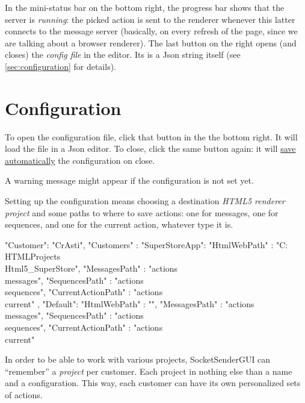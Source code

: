 \documentclass[11pt]{refart}
\newcommand{\marginicon}[2][]{\marginlabel{\raisebox{-.1\height}{\texttt{[image: \#2]}}}}
\newcommand*{\textAtt}[1]{\attention\underline{#1}}
\newcommand*{\socketsender}{SocketSenderGUI\xspace}
\begin{document}
In the mini-status bar on the bottom right, the progress bar shows that the server is \emph{running}: the picked action is sent to the renderer whenever this latter connects to the message server (basically, on every refresh of the page, since we are talking about a browser renderer).
The last button on the right opens (and closes) the \emph{config file} in the editor. 
Its is a Json string itself (see \autoref{sec:configuration} for details).


\section{Configuration}
\label{sec:configuration}

\marginicon[scale=0.5]{../icons/1481130257_Working_Tools_2}
To open the configuration file, click that button in the the bottom right. 
It will load the file in a Json editor. 
To close, click the same button again:
it will \textAtt{save automatically} the configuration on close.

A warning message might appear if the configuration is not set yet.

Setting up the configuration means choosing a destination \emph{HTML5 renderer project} and some paths to where to save actions: one for messages, one for sequences, and one for the current action, whatever type it is.

\begin{screenBox}[colbacktitle=white, coltitle=black, title=The configuration file]
\footnotesize
\begin{verbatimtab}[3]
{
	"Customer": "CrAsti",
	"Customers" : {
		"SuperStoreApp": {
			"HtmlWebPath" : "C:\\HTMLProjects\\Html5_SuperStore",
			"MessagesPath" : "actions\\messages",
			"SequencesPath" : "actions\\sequences",
			"CurrentActionPath" : "actions\\current"
		},
		"Default": {
			"HtmlWebPath" : "",
			"MessagesPath" : "actions\\messages",
			"SequencesPath" : "actions\\sequences",
			"CurrentActionPath" : "actions\\current"
		}
	}
}
\end{verbatimtab}
\end{screenBox}

In order to be able to work with various projects, \socketsender can ``remember'' a \emph{project} per customer.
Each project in nothing else than a name and a configuration.
This way, each customer can have its own personalized sets of actions.
\end{document}
